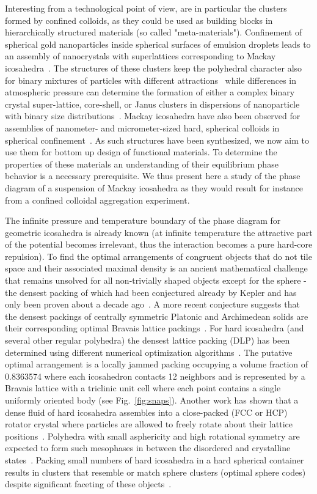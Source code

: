 \documentclass[10pt,aps,pre,twocolumn,superscriptaddress,amsmath,amssymb]{revtex4-1}
\begin{document}
Interesting from a technological point of view, are in particular the clusters formed by confined colloids, as they could be used as building blocks in hierarchically structured materials (so called "meta-materials"). Confinement of spherical gold nanoparticles inside spherical surfaces of emulsion droplets leads to an assembly of nanocrystals with superlattices corresponding to Mackay icosahedra~\cite{Lacava2012}.
The structures of these clusters keep the polyhedral character also for binary mixtures of particles with different attractions~\cite{Mravlak2016} while differences in atmospheric pressure can determine the formation of either a complex binary crystal super-lattice, core-shell, or Janus clusters in dispersions of nanoparticle with binary size distributions~\cite{Kister2016}.
Mackay icosahedra have also been observed for assemblies of nanometer- and micrometer-sized hard, spherical colloids in spherical confinement~\cite{DeNijs2015}.
As such structures have been synthesized, we now aim to use them for bottom up design of functional materials. To determine the properties of these materials an understanding of their equilibrium phase behavior is a necessary prerequisite. We thus present here a study of the phase diagram of a suspension of Mackay icosahedra as they would result for instance from a confined colloidal aggregation experiment.

The infinite pressure and temperature boundary of the phase diagram for geometric icosahedra is already known (at infinite temperature the attractive part of the potential becomes irrelevant, thus the interaction becomes a pure hard-core repulsion). To find the optimal arrangements of congruent objects that do not tile space and their associated maximal density is an ancient mathematical challenge that remains unsolved for all non-trivially shaped objects except for the sphere - the densest packing of which had been conjectured already by Kepler and has only been proven about a decade ago~\cite{Hales2005}.
A more recent conjecture suggests that the densest packings of centrally symmetric Platonic and Archimedean solids are their corresponding optimal Bravais lattice packings~\cite{Torquato2009}.
For hard icosahedra (and several other regular polyhedra) the densest lattice packing (DLP) has been determined using different numerical optimization algorithms~\cite{Betke2000,Conway2006,Torquato2009}.
The putative optimal arrangement is a locally jammed packing occupying a volume fraction of 0.8363574 where each icosahedron contacts 12 neighbors and is represented by a Bravais lattice with a triclinic unit cell where each point contains a single uniformly oriented body (see Fig.~\ref{fig:snaps}).
Another work has shown that a dense fluid of hard icosahedra assembles into a close-packed (FCC or HCP) rotator crystal where particles are allowed to freely rotate about their lattice positions~\cite{Damasceno2012}.
Polyhedra with small asphericity and high rotational symmetry are expected to form such mesophases in between the disordered and crystalline states~\cite{Agarwal2011}.
Packing small numbers of hard icosahedra in a hard spherical container results in clusters that resemble or match sphere clusters (optimal sphere codes) despite significant faceting of these objects~\cite{Teich2016}.
\end{document}
